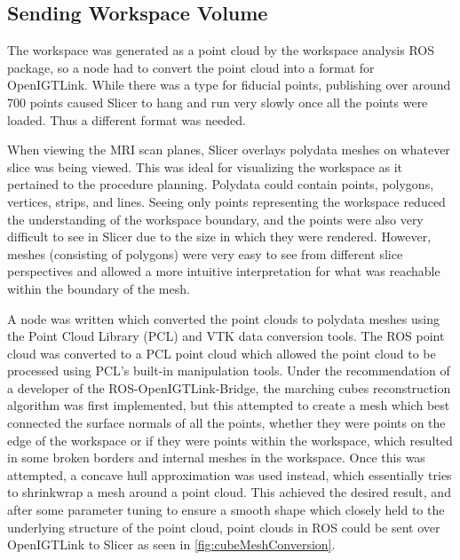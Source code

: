 \documentclass[12pt]{report}
\begin{document}
\subsection{Sending Workspace Volume}
\label{sec:sendingWorkspaceVolume}
The workspace was generated as a point cloud by the workspace analysis ROS package, so a node had to convert the point cloud into a format for OpenIGTLink. While there was a type for fiducial points, publishing over around 700 points caused Slicer to hang and run very slowly once all the points were loaded. Thus a different format was needed.

When viewing the MRI scan planes, Slicer overlays polydata meshes on whatever slice was being viewed. This was ideal for visualizing the workspace as it pertained to the procedure planning. Polydata could contain points, polygons, vertices, strips, and lines. Seeing only points representing the workspace reduced the understanding of the workspace boundary, and the points were also very difficult to see in Slicer due to the size in which they were rendered. However, meshes (consisting of polygons) were very easy to see from different slice perspectives and allowed a more intuitive interpretation for what was reachable within the boundary of the mesh.

A node was written which converted the point clouds to polydata meshes using the Point Cloud Library (PCL) and VTK data conversion tools. The ROS point cloud was converted to a PCL point cloud which allowed the point cloud to be processed using PCL's built-in manipulation tools. Under the recommendation of a developer of the ROS-OpenIGTLink-Bridge, the marching cubes reconstruction algorithm was first implemented, but this attempted to create a mesh which best connected the surface normals of all the points, whether they were points on the edge of the workspace or if they were points within the workspace, which resulted in some broken borders and internal meshes in the workspace. Once this was attempted, a concave hull approximation was used instead, which essentially tries to shrinkwrap a mesh around a point cloud. This achieved the desired result, and after some parameter tuning to ensure a smooth shape which closely held to the underlying structure of the point cloud, point clouds in ROS could be sent over OpenIGTLink to Slicer as seen in \autoref{fig:cubeMeshConversion}. 
\end{document}
